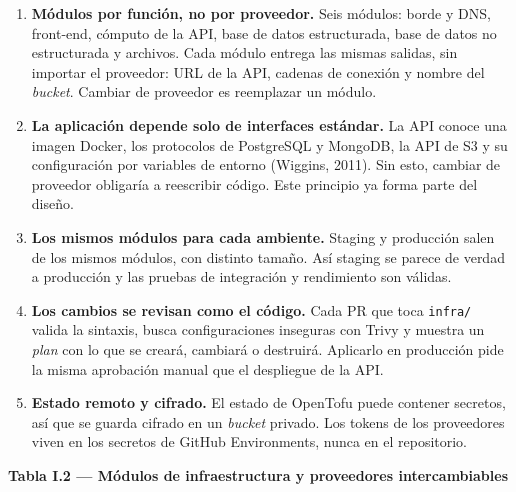 \documentclass[11pt,a4paper]{article}
\begin{document}
\begin{enumerate}
\item \textbf{Módulos por función, no por proveedor.} Seis módulos: borde y DNS, front-end, cómputo de la API, base de datos estructurada, base de datos no estructurada y archivos. Cada módulo entrega las mismas salidas, sin importar el proveedor: URL de la API, cadenas de conexión y nombre del \textit{bucket}. Cambiar de proveedor es reemplazar un módulo.
\item \textbf{La aplicación depende solo de interfaces estándar.} La API conoce una imagen Docker, los protocolos de PostgreSQL y MongoDB, la API de S3 y su configuración por variables de entorno (Wiggins, 2011). Sin esto, cambiar de proveedor obligaría a reescribir código. Este principio ya forma parte del diseño.
\item \textbf{Los mismos módulos para cada ambiente.} Staging y producción salen de los mismos módulos, con distinto tamaño. Así staging se parece de verdad a producción y las pruebas de integración y rendimiento son válidas.
\item \textbf{Los cambios se revisan como el código.} Cada PR que toca \texttt{infra/} valida la sintaxis, busca configuraciones inseguras con Trivy y muestra un \textit{plan} con lo que se creará, cambiará o destruirá. Aplicarlo en producción pide la misma aprobación manual que el despliegue de la API.
\item \textbf{Estado remoto y cifrado.} El estado de OpenTofu puede contener secretos, así que se guarda cifrado en un \textit{bucket} privado. Los tokens de los proveedores viven en los secretos de GitHub Environments, nunca en el repositorio.
\end{enumerate}

\textbf{Tabla I.2 --- Módulos de infraestructura y proveedores intercambiables}\nopagebreak
\end{document}
